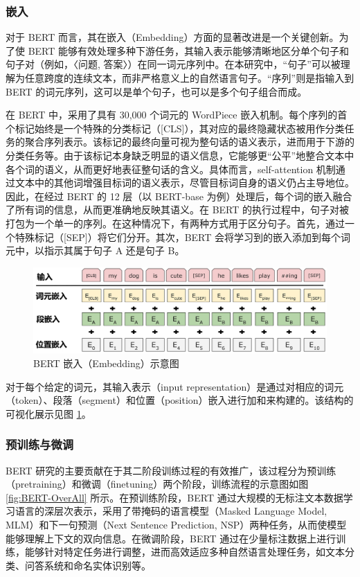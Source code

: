 \subsubsection{嵌入}

对于 BERT 而言，其在嵌入（Embedding）方面的显著改进是一个关键创新。为了使 BERT 能够有效处理多种下游任务，其输入表示能够清晰地区分单个句子和句子对（例如，〈问题, 答案〉）在同一词元序列中。在本研究中，“句子”可以被理解为任意跨度的连续文本，而非严格意义上的自然语言句子。“序列”则是指输入到 BERT 的词元序列，这可以是单个句子，也可以是多个句子组合而成。

在 BERT 中，采用了具有 30,000 个词元的 WordPiece 嵌入机制。每个序列的首个标记始终是一个特殊的分类标记（[CLS]），其对应的最终隐藏状态被用作分类任务的聚合序列表示。该标记的最终向量可视为整句话的语义表示，进而用于下游的分类任务等。由于该标记本身缺乏明显的语义信息，它能够更“公平”地整合文本中各个词的语义，从而更好地表征整句话的含义。具体而言，self-attention 机制通过文本中的其他词增强目标词的语义表示，尽管目标词自身的语义仍占主导地位。因此，在经过 BERT 的 12 层（以 BERT-base 为例）处理后，每个词的嵌入融合了所有词的信息，从而更准确地反映其语义。在 BERT 的执行过程中，句子对被打包为一个单一的序列。在这种情况下，有两种方式用于区分句子。首先，通过一个特殊标记（[SEP]）将它们分开。其次，BERT 会将学习到的嵌入添加到每个词元中，以指示其属于句子 A 还是句子 B。

\begin{figure}[htb]
	\centering
	\includegraphics[width=0.9\linewidth]{figures/bert_Input_Embeddings.jpg}
	\caption{BERT 嵌入（Embedding）示意图 \cite{devlin_bert_2019}}
	\label{fig:BERT-embedding}
\end{figure}

对于每个给定的词元，其输入表示（input representation）是通过对相应的词元（token）、段落（segment）和位置（position）嵌入进行加和来构建的。该结构的可视化展示见图 \ref{fig:BERT-embedding}。

\subsubsection{预训练与微调}

BERT 研究的主要贡献在于其二阶段训练过程的有效推广，该过程分为预训练（pretraining）和微调（finetuning）两个阶段，训练流程的示意图如图 \ref{fig:BERT-OverAll} 所示。在预训练阶段，BERT 通过大规模的无标注文本数据学习语言的深层次表示，采用了带掩码的语言模型（Masked Language Model, MLM）和下一句预测（Next Sentence Prediction, NSP）两种任务，从而使模型能够理解上下文的双向信息。在微调阶段，BERT 通过在少量标注数据上进行训练，能够针对特定任务进行调整，进而高效适应多种自然语言处理任务，如文本分类、问答系统和命名实体识别等。

